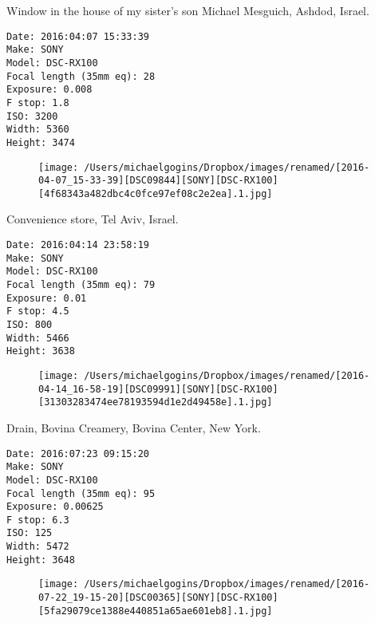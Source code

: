 \documentclass[11pt,letter,DIV=14,paper=landscape]{scrbook}
\begin{document}
\clearpage
\noindent Window in the house of my sister's son Michael Mesguich, Ashdod, Israel.
\noindent
\begin{lstlisting}
Date: 2016:04:07 15:33:39
Make: SONY
Model: DSC-RX100
Focal length (35mm eq): 28
Exposure: 0.008
F stop: 1.8
ISO: 3200
Width: 5360
Height: 3474
\end{lstlisting}
\clearpage

\begin{figure}
\texttt{[image: /Users/michaelgogins/Dropbox/images/renamed/[2016-04-07\_15-33-39][DSC09844][SONY][DSC-RX100][4f68343a482dbc4c0fce97ef08c2e2ea].1.jpg]}
\end{figure}
    
\clearpage
\noindent Convenience store, Tel Aviv, Israel.
\noindent
\begin{lstlisting}
Date: 2016:04:14 23:58:19
Make: SONY
Model: DSC-RX100
Focal length (35mm eq): 79
Exposure: 0.01
F stop: 4.5
ISO: 800
Width: 5466
Height: 3638
\end{lstlisting}
\clearpage

\begin{figure}
\texttt{[image: /Users/michaelgogins/Dropbox/images/renamed/[2016-04-14\_16-58-19][DSC09991][SONY][DSC-RX100][31303283474ee78193594d1e2d49458e].1.jpg]}
\end{figure}
    
\clearpage
\noindent Drain, Bovina Creamery, Bovina Center, New York.
\noindent
\begin{lstlisting}
Date: 2016:07:23 09:15:20
Make: SONY
Model: DSC-RX100
Focal length (35mm eq): 95
Exposure: 0.00625
F stop: 6.3
ISO: 125
Width: 5472
Height: 3648
\end{lstlisting}
\clearpage

\begin{figure}
\texttt{[image: /Users/michaelgogins/Dropbox/images/renamed/[2016-07-22\_19-15-20][DSC00365][SONY][DSC-RX100][5fa29079ce1388e440851a65ae601eb8].1.jpg]}
\end{figure}
    
\end{document}
